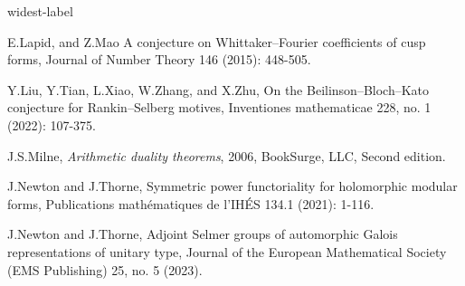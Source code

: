\documentclass[12pt,oneside,reqno]{amsart}
\theoremstyle{plain}
\begin{document}
\begin{thebibliography}{widest-label}
		
		
		
		
		
		
		
		
		
		
		E.Lapid, and Z.Mao
		A conjecture on Whittaker–Fourier coefficients of cusp forms,
		Journal of Number Theory 146 (2015): 448-505.
		
		
		
		
		Y.Liu, Y.Tian, L.Xiao, W.Zhang, and X.Zhu,
		On the Beilinson–Bloch–Kato conjecture for Rankin–Selberg motives,
		Inventiones mathematicae 228, no. 1 (2022): 107-375.
		
		
		J.S.Milne,
		\textit{Arithmetic duality theorems},
		2006,
		BookSurge, LLC,
		Second edition.
		
		
		
		
		
		
		
		
		
		
		
		
		
		
		
		
		
		
		
		
		J.Newton and J.Thorne,
		Symmetric power functoriality for holomorphic modular forms,
		Publications math\'{e}matiques de l'IH\'{E}S 134.1 (2021): 1-116.
		
		
		
		
		
		
		J.Newton and J.Thorne,
		Adjoint Selmer groups of automorphic Galois representations of unitary type, Journal of the European Mathematical Society (EMS Publishing) 25, no. 5 (2023).
		
		
		
		
		

\end{thebibliography}
\end{document}
